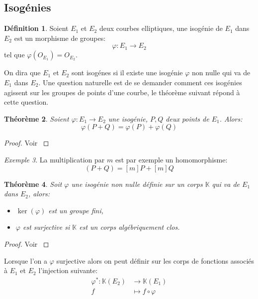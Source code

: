 \documentclass[10pt,a4paper]{book}
\theoremstyle{plain}
\newtheorem{thm}{Théorème}
\theoremstyle{definition}
\theoremstyle{definition}
\theoremstyle{definition}
\theoremstyle{definition}
\newtheorem{defi}[thm]{Définition}
\theoremstyle{remark}
\theoremstyle{remark}
\newtheorem{exe}[thm]{Exemple}
\begin{document}
\subsection{Isogénies}

\begin{defi}
Soient $E_1$ et $E_2$ deux courbes elliptiques, une isogénie de $E_1$ dans $E_2$ est un morphisme de groupes:
\begin{equation*}
\varphi:E_1 \rightarrow E_2
\end{equation*}
tel que $\varphi(O_{E_1})=O_{E_2}$.
\end{defi}
On dira que $E_1$ et $E_2$ sont isogénes si il existe une isogénie $\varphi$ non nulle qui va de $E_1$ dans $E_2$. Une question naturelle est de se demander comment ces isogénies agissent sur les groupes de points d'une courbe, le théorème suivant répond à cette question.

\begin{thm}
Soient $\varphi:E_1 \rightarrow E_2$ une isogénie, $P,Q$ deux points de $E_1$. Alors:
\begin{equation*}
\varphi(P+Q)=\varphi(P)+\varphi(Q)
\end{equation*}
\end{thm}

\begin{proof}
Voir \cite[III.4.8]{Silv1}
\end{proof}

\begin{exe}
La multiplication par $m$ est par exemple un homomorphisme:
\begin{equation*}
[m](P+Q)=[m]P+[m]Q
\end{equation*}
\end{exe}

\begin{thm}
Soit $\varphi$ une isogénie non nulle définie sur un corps $\mathbb{K}$ qui va de $E_1$ dans $E_2$, alors:
\begin{itemize}
\item $\ker(\varphi)$ est un groupe fini,
\item $\varphi$ est surjective si $\mathbb{K}$ est un corps algébriquement clos.
\end{itemize}
\end{thm}

\begin{proof}
Voir \cite[II.2]{Silv1}
\end{proof}

Lorsque l'on a $\varphi$ surjective alors on peut définir sur les corps de fonctions associés à $E_1$ et $E_2$ l'injection suivante:
\begin{equation*}
\begin{alignedat}{1}
\varphi^*: \mathbb{K}(E_2) & \rightarrow \mathbb{K}(E_1) \\
f & \mapsto f  \circ \varphi
\end{alignedat}
\end{equation*}
\end{document}
